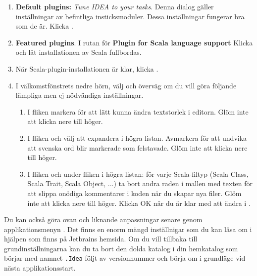 \begin{enumerate}
\item \textbf{Default plugins:} \emph{Tune IDEA to your tasks}. Denna dialog gäller inställningar av befintliga insticksmoduler. Dessa inställningar fungerar bra som de är. Klicka .

\item \textbf{Featured plugins}. I rutan för \textbf{Plugin for Scala language support} Klicka  och låt installationen av Scala fullbordas.

\item När Scala-plugin-installationen är klar, klicka .

\item I välkomstfönstrets nedre hörn, välj  och överväg om du vill göra följande lämpliga men ej nödvändiga inställningar.
\begin{enumerate}
\item I fliken  markera  för att lätt kunna ändra textstorlek i editorn. Glöm inte att klicka  nere till höger.

\item I fliken  och välj att expandera  i högra listan. Avmarkera  för att undvika att svenska ord blir markerade som felstavade. Glöm inte att klicka  nere till höger.

\item I fliken  och under fliken  i högra listan: för varje Scala-filtyp (Scala Class, Scala Trait, Scala Object, ...) ta bort andra raden i mallen med texten  för att slippa onödiga kommentarer i koden när du skapar nya filer. Glöm inte att klicka  nere till höger. Klicka OK när du är klar med att ändra i .

\end{enumerate}
\end{enumerate}
Du kan också göra ovan och liknande anpassningar senare genom applikationsmenyn . Det finns en enorm mängd inställnigar som du kan läsa om i hjälpen som finns på Jetbrains hemsida. Om du vill tillbaka till grundinställningarna kan du ta bort den dolda katalog i din hemkatalog som börjar med namnet \texttt{.Idea} följt av versionnummer och börja om i grundläge vid nästa applikationsstart.





